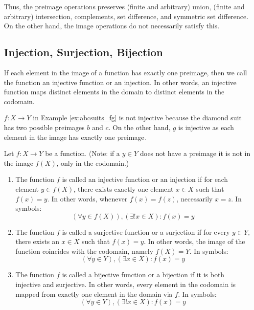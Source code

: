 Thus, the preimage operations preserves (finite and arbitrary) union, (finite and arbitrary) intersection, complements, set difference, and symmetric set difference. On the other hand, the image operations do not necessarily satisfy this.


\subsection{Injection, Surjection, Bijection}
If each element in the image of a function has exactly one preimage, then we call the function an injective function or an injection. In other words, an injective function maps distinct elements in the domain to distinct elements in the codomain.

\begin{example}
    $f : X \to Y$ in Example \ref{ex:abcsuits_fg} is not injective because the diamond suit has two possible preimages $b$ and $c$. On the other hand, $g$ is injective as each element in the image has exactly one preimage.
\end{example}

\begin{definition} Let $f: X \to Y$ be a function.
    (Note: if a $y \in Y$ does not have a preimage it is not in the image $f(X)$, only in the codomain.)

    \begin{enumerate}
        \item The function $f$ is called an injective function or an injection if for each element $y \in f(X)$, there exists exactly one element $x \in X$ such that $f(x) = y$. In other words, whenever $f(x) = f(z)$, necessarily $x = z$. In symbols:
        $$
        (\forall y \in f(X)), (\exists! x \in X) : f(x) = y
        $$

        \item The function $f$ is called a surjective function or a surjection if for every $y \in Y$, there exists an $x \in X$ such that $f(x) = y$. In other words, the image of the function coincides with the codomain, namely $f(X) = Y$. In symbols:
        $$
        (\forall y \in Y), (\exists x \in X) : f(x) = y
        $$

        \item The function $f$ is called a bijective function or a bijection if it is both injective and surjective. In other words, every element in the codomain is mapped from exactly one element in the domain via $f$. In symbols:
        $$
        (\forall y \in Y), (\exists! x \in X) : f(x) = y
        $$
    \end{enumerate}
\end{definition}

